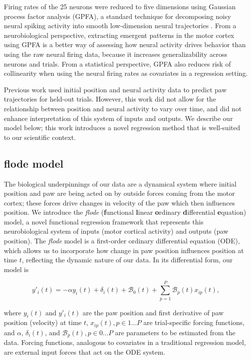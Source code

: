 \documentclass[preprint]{JASA}
\begin{document}
Firing rates of the 25 neurons were reduced to five dimensions using
Gaussian process factor analysis (GPFA), a standard technique for
decomposing noisy neural spiking activity into smooth low-dimension
neural trajectories \citep{yu2009}. From a neurobiological perspective,
extracting emergent patterns in the motor cortex using GPFA is a better
way of assessing how neural activity drives behavior than using the raw
neural firing data, because it increases generalizability across neurons
and trials. From a statistical perspective, GPFA also reduces risk of
collinearity when using the neural firing rates as covariates in a
regression setting.

Previous work used initial position and neural activity data to predict
paw trajectories for held-out trials. However, this work did not allow
for the relationship between position and neural activity to vary over
time, and did not enhance interpretation of this system of inputs and
outputs. We describe our model below; this work introduces a novel
regression method that is well-suited to our scientific context.

\hypertarget{flode-model}{%
\subsection{flode model}\label{flode-model}}

\label{sec:flode}

The biological underpinnings of our data are a dynamical system where
initial position and paw are being acted on by outside forces coming
from the motor cortex; these forces drive changes in velocity of the paw
which then influences position. We introduce the \emph{flode}
(\textbf{f}unctional \textbf{l}inear \textbf{o}rdinary
\textbf{d}ifferential \textbf{e}quation) model, a novel functional
regression framework that represents this neurobiological system of
inputs (motor cortical activity) and outputs (paw position). The
\emph{flode} model is a first-order ordinary differential equation
(ODE), which allows us to incorporate how change in paw position
influences position at time \(t\), reflecting the dynamic nature of our
data. In its differential form, our model is

\begin{equation}
\label{eq:flode_deriv}
y'_i(t) = -\alpha y_i(t) + \delta_i(t) + \mathcal{B}_0(t) + \sum_{p = 1}^P \mathcal{B}_p(t) x_{ip}(t),
\end{equation}

\noindent where \(y_i(t)\) and \(y'_i(t)\) are the paw position and
first derivative of paw position (velocity) at time \(t\),
\(x_{ip}(t), p \in 1\ldots P\) are trial-specific forcing functions, and
\(\alpha\), \(\delta_i(t)\), and \(\mathcal{B}_p(t), p\in 0\ldots P\)
are parameters to be estimated from the data. Forcing functions,
analogous to covariates in a traditional regression model, are external
input forces that act on the ODE system.
\end{document}
